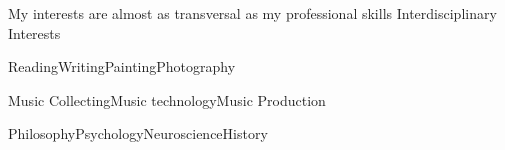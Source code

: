 \begin{cventries}
  \cventry
    {My interests are almost as transversal as my professional skills} %
    {Interdisciplinary Interests} %
    {} %
    {} %
    {
      \begin{cvitems} %
        \item {Reading{\enskip\cdotp\enskip}Writing{\enskip\cdotp\enskip}Painting{\enskip\cdotp\enskip}Photography}
        \item {Music Collecting{\enskip\cdotp\enskip}Music technology{\enskip\cdotp\enskip}Music Production}
        \item {Philosophy{\enskip\cdotp\enskip}Psychology{\enskip\cdotp\enskip}Neuroscience{\enskip\cdotp\enskip}History}
      \end{cvitems}
    }
\end{cventries}
